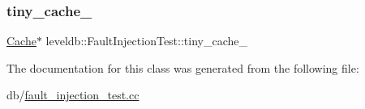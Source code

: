 \subsubsection{\texorpdfstring{tiny\_cache\_}{tiny\_cache\_}}
{\footnotesize\ttfamily \mbox{\hyperlink{classleveldb_1_1_cache}{Cache}}$\ast$ leveldb\+::\+Fault\+Injection\+Test\+::tiny\+\_\+cache\+\_\+}



The documentation for this class was generated from the following file\+:\begin{DoxyCompactItemize}
\item 
db/\mbox{\hyperlink{fault__injection__test_8cc}{fault\+\_\+injection\+\_\+test.\+cc}}\end{DoxyCompactItemize}
